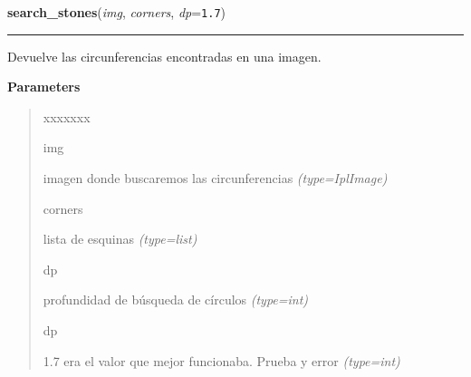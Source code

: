 \hspace{.8\funcindent}\begin{boxedminipage}{\funcwidth}

    \raggedright \textbf{search\_stones}(\textit{img}, \textit{corners}, \textit{dp}={\tt 1.7})

    \vspace{-1.5ex}

    \rule{\textwidth}{0.5\fboxrule}
\setlength{\parskip}{2ex}
Devuelve las circunferencias encontradas en una imagen.

\setlength{\parskip}{1ex}
      \textbf{Parameters}
      \vspace{-1ex}

      \begin{quote}
        \begin{Ventry}{xxxxxxx}

          \item[img]


imagen donde buscaremos las circunferencias
            {\it (type=IplImage)}

          \item[corners]


lista de esquinas
            {\it (type=list)}

          \item[dp]


profundidad de búsqueda de círculos
            {\it (type=int)}

          \item[dp]


1.7 era el valor que mejor funcionaba. Prueba y error
            {\it (type=int)}

        \end{Ventry}

      \end{quote}

    \end{boxedminipage}

    \label{src:search_stones:check_color_stone}

    \vspace{0.5ex}

